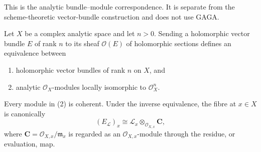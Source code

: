 \begin{lemma}
\label{lemma-holomorphic-vector-bundles-locally-free-analytic-modules}
\begin{reference}
\cite[Chapter V, \S 5.6, p. 219]{Tohoku}
\end{reference}
\begin{history}
This is the analytic bundle--module correspondence. It is separate from
the scheme-theoretic vector-bundle construction and does not use GAGA.
\end{history}
Let $X$ be a complex analytic space and let $n>0$. Sending a holomorphic
vector bundle $E$ of rank $n$ to its sheaf $\mathcal O(E)$ of holomorphic
sections defines an equivalence between
\begin{enumerate}
\item holomorphic vector bundles of rank $n$ on $X$, and
\item analytic $\mathcal O_X$-modules locally isomorphic to
$\mathcal O_X^n$.
\end{enumerate}
Every module in (2) is coherent. Under the inverse equivalence, the fibre
at $x\in X$ is canonically
$$
(E_{\mathcal L})_x
\cong
\mathcal L_x\otimes_{\mathcal O_{X,x}}\mathbf C,
$$
where $\mathbf C=\mathcal O_{X,x}/\mathfrak m_x$ is regarded as an
$\mathcal O_{X,x}$-module through the residue, or evaluation, map.
\end{lemma}

